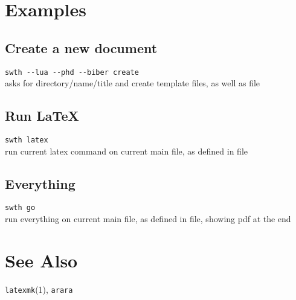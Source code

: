 \documentclass{scrartcl}
\renewcommand{\Prog}[1]{\texttt{#1}}                      %
\renewcommand{\Cmd}[2]{\texttt{#1}(#2)}                   %
\begin{document}
\section{Examples}

\subsection{Create a new document}

\verb+swth --lua --phd --biber create+\\
asks for directory/name/title and create template files, as well as
 file

\subsection{Run \LaTeX}

\verb+swth latex+\\
run current latex command on current main file, as defined in  file

\subsection{Everything}

\verb+swth go+\\
run everything on current main file, as defined in  file, showing
pdf at the end

\section{See Also}

\Cmd{latexmk}{1}, \Prog{arara}
\end{document}
